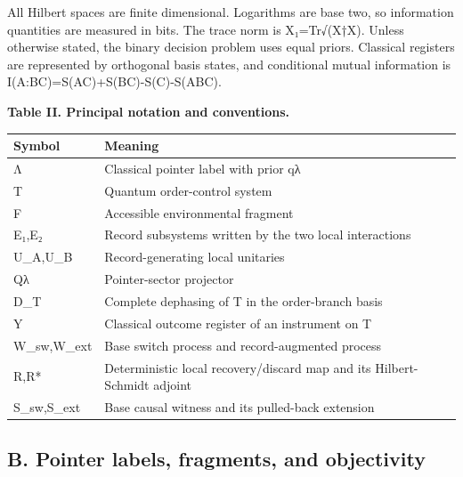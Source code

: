 \documentclass[
]{article}
\begin{document}
All Hilbert spaces are finite dimensional. Logarithms are base two, so
information quantities are measured in bits. The trace norm is
\textbar\textbar X\textbar\textbar₁=Tr√(X†X). Unless otherwise stated,
the binary decision problem uses equal priors. Classical registers are
represented by orthogonal basis states, and conditional mutual
information is I(A:B\textbar C)=S(AC)+S(BC)-S(C)-S(ABC).

\textbf{Table II. Principal notation and conventions.}

\begin{longtable}[]{@{}
  >{\raggedright\arraybackslash}p{}
  >{\raggedright\arraybackslash}p{}@{}}
\toprule\noalign{}
\begin{minipage}[b]{\linewidth}\raggedright
\textbf{Symbol}
\end{minipage} & \begin{minipage}[b]{\linewidth}\raggedright
\textbf{Meaning}
\end{minipage} \\
\midrule\noalign{}
\endhead
\bottomrule\noalign{}
\endlastfoot
Λ & Classical pointer label with prior qλ \\
T & Quantum order-control system \\
F & Accessible environmental fragment \\
E₁,E₂ & Record subsystems written by the two local interactions \\
U\_A,U\_B & Record-generating local unitaries \\
Qλ & Pointer-sector projector \\
D\_T & Complete dephasing of T in the order-branch basis \\
Y & Classical outcome register of an instrument on T \\
W\_sw,W\_ext & Base switch process and record-augmented process \\
R,R* & Deterministic local recovery/discard map and its Hilbert-Schmidt
adjoint \\
S\_sw,S\_ext & Base causal witness and its pulled-back extension \\
\end{longtable}

\subsection{B. Pointer labels, fragments, and
objectivity}\label{b.-pointer-labels-fragments-and-objectivity}
\end{document}
